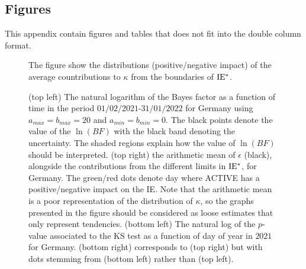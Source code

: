 \documentclass[fleqn,usenatbib,nofootinbib]{revtex4-2}
\begin{document}
\begin{appendices}
		\section{Figures}
		\label{app:figs}
		This appendix contain figures and tables that does not fit into the double column format. 
		\onecolumngrid
		
		\begin{figure}[H]
			\caption{\label{fig:ten} The figure show the distributions (positive/negative impact) of the average countributions to $\kappa$ from the boundaries of $\rm IE^*$.}
		\end{figure}
		
		\begin{figure}[H]
			\caption{\label{fig:a0} (top left) The natural logarithm of the Bayes factor as a function of time in the period $01/02/2021$-$31/01/2022$ for Germany using $a_{max}=b_{max}=20$ and $a_{min}=b_{min}=0$. The black points denote the value of the $\ln(BF)$ with the black band denoting the uncertainty. The shaded regions explain how the value of $\ln(BF)$ should be interpreted. (top right) the arithmetic mean of $\epsilon$ (black), alongside the contributions from the different limits in $\rm IE^*$, for Germany. The green/red dots denote day where ACTIVE has a positive/negative impact on the IE. Note that the arithmetic mean is a poor representation of the distribution of $\kappa$, so the graphs presented in the figure should be considered as loose estimates that only represent tendencies. (bottom left) The natural log of the $p$-value associated to the KS test as a function of day of year in $2021$ for Germany. (bottom right) corresponds to (top right) but with dots stemming from (bottom left) rather than (top left).}
		\end{figure}
		

\end{appendices}
\end{document}
